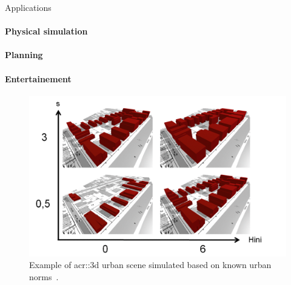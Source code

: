 \documentclass[12pt]{beamer}
\begin{document}
            \begin{frame}{Applications}
                \framesubtitle<1>{Physical simulation}
                \framesubtitle<2>{Planning}
                \framesubtitle<3>{Entertainement}

                {
                    \begin{figure}[H]
                        \centering
                        \includegraphics[width=.8\textwidth]{images/introduction/3d_model_applications/simplu}
                        \caption{Example of \gls{acr::3d} urban scene simulated based on known urban norms~\parencite{brasebin2017stochastic}.}
                    \end{figure}
                }
                {
                    \begin{figure}[H]
                        \centering

\end{figure}}
\end{frame}
\end{document}
